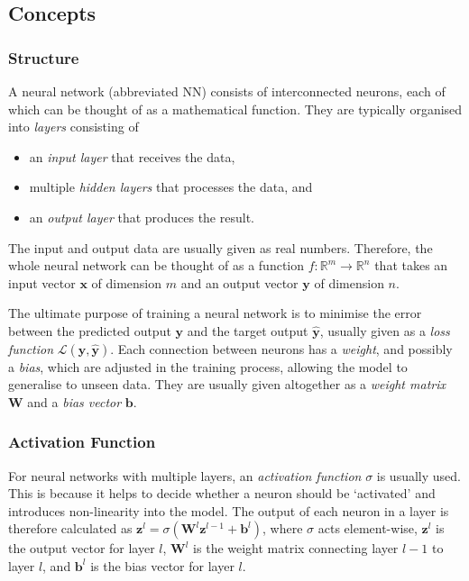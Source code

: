 \documentclass[a4paper,11pt,titlepage]{article}
\theoremstyle{definition}
\theoremstyle{plain}
\theoremstyle{remark}
\begin{document}
\subsection{Concepts}

\subsubsection{Structure}

 A neural network (abbreviated NN) consists of interconnected neurons, each of which can be thought of as a mathematical function. They are typically organised into \textit{layers} consisting of

\begin{itemize}
    \item an \textit{input layer} that receives the data,
    \item multiple \textit{hidden layers} that processes the data, and
    \item an \textit{output layer} that produces the result.
\end{itemize}

The input and output data are usually given as real numbers. Therefore, the whole neural network can be thought of as a function $f:\mathbb{R}^m\rightarrow\mathbb{R}^n$ that takes an input vector $\mathbf{x}$ of dimension $m$ and an output vector $\mathbf{y}$ of dimension $n$.

The ultimate purpose of training a neural network is to minimise the error between the predicted output $\mathbf{y}$ and the target output $\mathbf{\hat{y}}$, usually given as a \textit{loss function} $\mathcal{L}(\mathbf{y}, \mathbf{\hat{y}})$. Each connection between neurons has a \textit{weight}, and possibly a \textit{bias}, which are adjusted in the training process, allowing the model to generalise to unseen data. They are usually given altogether as a \textit{weight matrix} $\mathbf{W}$ and a \textit{bias vector} $\mathbf{b}$.

\subsubsection{Activation Function}

For neural networks with multiple layers, an \textit{activation function} $\sigma$ is usually used. This is because it helps to decide whether a neuron should be ‘activated’ and introduces non-linearity into the model. The output of each neuron in a layer is therefore calculated as $\mathbf{z}^l=\sigma\left(\mathbf{W}^l\mathbf{z}^{l-1}+\mathbf{b}^l\right)$, where $\sigma$ acts element-wise, $\mathbf{z}^l$ is the output vector for layer $l$, $\mathbf{W}^l$ is the weight matrix connecting layer $l-1$ to layer $l$, and $\mathbf{b}^l$ is the bias vector for layer $l$. 
\end{document}
